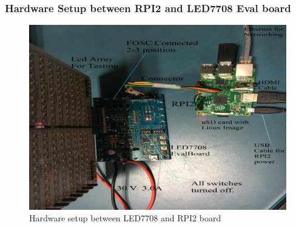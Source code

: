 \subsubsection{Hardware Setup between RPI2 and LED7708 Eval board}
\begin{figure}[ht]
         \centering
         \includegraphics[scale=0.4]{images/raspberryledsetup.png}
         \caption{Hardware setup between LED7708 and RPI2 board}
\end{figure}
